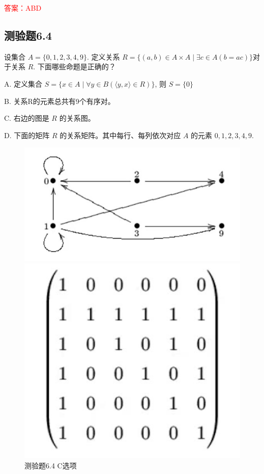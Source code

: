 \documentclass[UTF8, heading=true]{ctexart}
\begin{document}
\textcolor{red}{答案：ABD}


\subsection{测验题6.4}
设集合 $A=\{0,1,2,3,4,9\}$. 定义关系 $R=\{(a, b) \in A \times A \mid \exists c \in A(b=a c)\}$对于关系 $R$. 下面哪些命题是正确的？

A. 定义集合 $S=\{x \in A \mid \forall y \in B(\langle y, x\rangle \in R)\}$, 则 $S=\{0\}$

B. 
关系R的元素总共有9个有序对。

C. 
右边的图是 $R$ 的关系图。

D. 
下面的矩阵 $R$ 的关系矩阵。其中每行、每列依次对应 $A$ 的元素 $0,1,2,3,4,9$.

\begin{figure}[H]
    \centering
    \begin{minipage}[t]{0.45\textwidth}
        \centering
        \includegraphics[width=1\textwidth]{6.4_1.jpg} %
	      \vspace{-0.5cm}
        \caption{测验题6.4 C选项}
    \end{minipage}
	  \hspace{0.1\textwidth} %
    \begin{minipage}[t]{0.3\textwidth}
        \centering
        \includegraphics[width=1\textwidth]{6.4_2.jpg} %

\end{minipage}
\end{figure}
\end{document}

